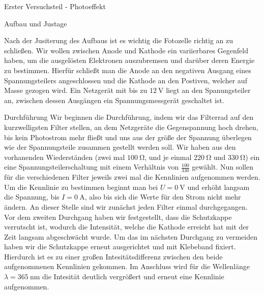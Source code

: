 \documentclass[pdftex, a4paper,11pt, twoside, ngerman]{report}
\begin{document}
\begin{chapter}{Erster Versuchsteil - Photoeffekt}
\begin{section}{Aufbau und Justage}
\begin{figure}[htbp]
\begin{center}
        \end{center}
      \end{figure}
      Nach der Jusiterung des Aufbaus ist es wichtig die Fotozelle richtig an zu schließen.
      Wir wollen zwischen Anode und Kathode ein variierbares Gegenfeld haben, um die ausgelösten Elektronen auszubremsen und darüber deren Energie zu bestimmen.
      Hierfür schließt man die Anode an den negativen Ausgang eines Spannungsteilers angeschlossen und die Kathode an den Postiven, welcher auf Masse gezogen wird.
      Ein Netzgerät mit bis zu $\SI{12}{\volt}$ liegt an den Spanungsteiler an, zwischen dessen Ausgängen ein Spannungsmessgerät geschaltet ist.
      
    \end{section}
    
    \begin{section}{Durchführung}
      \label{chp:Aufbau:sec:ERSTERTEIL:subsec:UNTERTEIL}
      Wir beginnen die Durchführung, indem wir das Filterrad auf den kurzwelligsten Filter stellen, an dem Netzgeräte die Gegenspannung hoch drehen, bis kein Photostrom mehr fließt und uns aus der größe der Spannung überlegen wie der Spannungsteile zusammen gestellt werden soll. Wir haben aus den vorhanenden Wiederständen (zwei mal $\SI{100}{\ohm}$, und je einmal $\SI{220}{\ohm}$ und $\SI{330}{\ohm}$) ein eine Spannungsteilerschaltung mit einem Verhältnis von $\frac{100}{330}$ gewählt. Nun sollen für die verschiedenen Filter jeweils zwei mal die Kennlinien aufgenommen werden.
      Um die Kennlinie zu bestimmen beginnt man bei $U=\SI{0}{\volt}$ und erhöht langsam die Spannung, bis $I=\SI{0}{\ampere}$, also bis sich die Werte für den Strom nicht mehr ändern. An dieser Stelle sind wir zunächst jeden Filter einmal durchgegangen. Vor dem zweiten Durchgang haben wir festgestellt, dass die Schutzkappe verrutscht ist, wodurch die Intensität, welche die Kathode erreicht hat mit der Zeit langsam abgeschwächt wurde. Um das im nächsten Durchgang zu vermeiden haben wir die Schutzkappe erneut ausgerichtet und mit Klebeband fixiert. Hierdurch ist es zu einer großen Intesitätsdifferenz zwischen den beide aufgenommenen Kennlinien gekommen. Im Anschluss wird für die Wellenlänge $\lambda = \SI{365}{\nano\meter}$ die Intesität deutlich vergrößert und erneut eine Kennlinie aufgenommen.  


\end{section}
\end{chapter}
\end{document}
